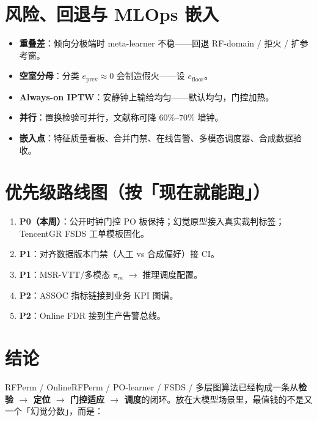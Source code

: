 \documentclass[11pt,a4paper,UTF8,fontset=none]{ctexart}
\begin{document}
\section{风险、回退与 MLOps 嵌入}
\label{sec:mlops}

\begin{itemize}
  \item \textbf{重叠差}：倾向分极端时 meta-learner 不稳——回退 RF-domain / 拒火 / 扩参考窗。
  \item \textbf{空室分母}：分类 \(e_{\mathrm{prev}}\approx 0\) 会制造假火——设 \(e_{\mathrm{floor}}\)。
  \item \textbf{Always-on IPTW}：安静钟上输给均匀——默认均匀，门控加热。
  \item \textbf{并行}：置换检验可并行，文献称可降 60\%--70\% 墙钟。
  \item \textbf{嵌入点}：特征质量看板、合并门禁、在线告警、多模态调度器、合成数据验收。
\end{itemize}

\section{优先级路线图（按「现在就能跑」）}
\label{sec:roadmap}

\begin{enumerate}
  \item \textbf{P0（本周）}：公开时钟门控 PO 板保持；幻觉原型接入真实裁判标签；TencentGR FSDS 工单模板固化。
  \item \textbf{P1}：对齐数据版本门禁（人工 vs 合成偏好）接 CI。
  \item \textbf{P1}：MSR-VTT/多模态 \(\pi_m\) \(\to\) 推理调度配置。
  \item \textbf{P2}：ASSOC 指标链接到业务 KPI 图谱。
  \item \textbf{P2}：Online FDR 接到生产告警总线。
\end{enumerate}

\section{结论}
\label{sec:conclusion}

RFPerm / OnlineRFPerm / PO-learner / FSDS / 多层图算法已经构成一条从\textbf{检验 \(\to\) 定位 \(\to\) 门控适应 \(\to\) 调度}的闭环。放在大模型场景里，最值钱的不是又一个「幻觉分数」，而是：
\end{document}
